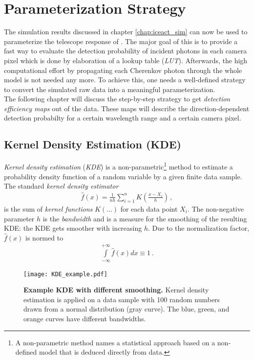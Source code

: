 \chapter{\iceact Parameterization Strategy}\label{chap:param_strategy}

The simulation results discussed in chapter \ref{chap:iceact_sim} can now be used to parameterize the telescope response of \iceact. The major goal of this is to provide a fast way to evaluate the detection probability of incident photons in each camera pixel which is done by elaboration of a lookup table (\textit{LUT}). Afterwards, the high computational effort by propagating each Cherenkov photon through the whole \geant model is not needed any more. To achieve this, one needs a well-defined strategy to convert the simulated raw data into a meaningful parameterization.\\

The following chapter will discuss the step-by-step strategy to get \textit{detection efficiency maps} out of the \geant data. These maps will describe the direction-dependent detection probabilty for a certain wavelength range and a certain camera pixel.

\section{Kernel Density Estimation (KDE)}

\textit{Kernel density estimation} (\textit{KDE}) is a non-parametric\footnote{A non-parametric method names a statistical approach based on a non-defined model that is deduced directly from data.} method to estimate a probability density function of a random variable by a given finite data sample. The standard \textit{kernel density estimator}
\begin{align}
	\hat{f}(x)=\frac{1}{nh}\sum_{i=1}^{n}K\left(\frac{x-X_i}{h}\right)\,,
	\label{eq:kde}
\end{align}
is the sum of \textit{kernel functions} $K(\dots)$ for each data point $X_i$. The non-negative parameter $h$ is the \textit{bandwidth} and is a measure for the smoothing of the resulting KDE: the KDE gets smoother with increasing $h$. Due to the normalization factor, $\hat{f}(x)$ is normed to
\begin{align}
	\int\limits_{-\infty}^{+\infty}\hat{f}(x)dx \equiv 1\,.
	\label{kde:norm}
\end{align}

\begin{figure}[H]
	\centering
	\texttt{[image: KDE\_example.pdf]}
	\caption[Example KDE with different smoothing]{\textbf{Example KDE with different smoothing.} \cite{kde:example_plot} Kernel density estimation is applied on a data sample with 100 random numbers drawn from a normal distribution (gray curve). The blue, green, and orange curves have different bandwidths.}
	\label{kde:example_1d}	
\end{figure}

